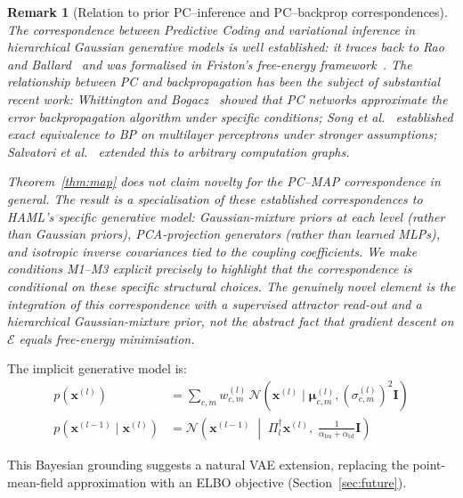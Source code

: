 \documentclass[11pt,a4paper]{article}
\newtheorem{remark}[theorem]{Remark}
\begin{document}
\begin{remark}[Relation to prior PC--inference and PC--backprop correspondences]
\label{rem:map_priorwork}
The correspondence between Predictive Coding and variational inference in hierarchical
Gaussian generative models is well established: it traces back to Rao and
Ballard~\cite{rao1999predictive} and was formalised in Friston's free-energy
framework~\cite{friston2005theory}. The relationship between PC and backpropagation
has been the subject of substantial recent work: Whittington and
Bogacz~\cite{whittington2017approximation} showed that PC networks approximate the
error backpropagation algorithm under specific conditions; Song et
al.~\cite{song2020can} established exact equivalence to BP on multilayer perceptrons
under stronger assumptions; Salvatori et al.~\cite{salvatori2021exactbp} extended this
to arbitrary computation graphs.

Theorem~\ref{thm:map} does \emph{not} claim novelty for the PC--MAP correspondence in
general. The result is a \emph{specialisation} of these established correspondences to
HAML's specific generative model: Gaussian-mixture priors at each level (rather than
Gaussian priors), PCA-projection generators (rather than learned MLPs), and isotropic
inverse covariances tied to the coupling coefficients. We make conditions M1--M3
explicit precisely to highlight that the correspondence is conditional on these
specific structural choices. The genuinely novel element is the integration of this
correspondence with a supervised attractor read-out and a hierarchical Gaussian-mixture
prior, not the abstract fact that gradient descent on $\mathcal{E}$ equals
free-energy minimisation.
\end{remark}

The implicit generative model is:
\begin{align}
  p(\mathbf{x}^{(l)}) &=
    \sum_{c,m} w^{(l)}_{c,m}\, \mathcal{N}(\mathbf{x}^{(l)} \mid \boldsymbol{\mu}^{(l)}_{c,m},
    (\sigma^{(l)}_{c,m})^2\mathbf{I}) \\
  p(\mathbf{x}^{(l-1)} \mid \mathbf{x}^{(l)}) &=
    \mathcal{N}\!\left(\mathbf{x}^{(l-1)} \;\middle|\; \Pi_l^\dagger \mathbf{x}^{(l)},\;
    \tfrac{1}{\alpha_{\mathrm{bu}}+\alpha_{\mathrm{td}}}\mathbf{I}\right)
\end{align}

This Bayesian grounding suggests a natural VAE extension, replacing the point-mean-field
approximation with an ELBO objective (Section~\ref{sec:future}).

\end{document}
